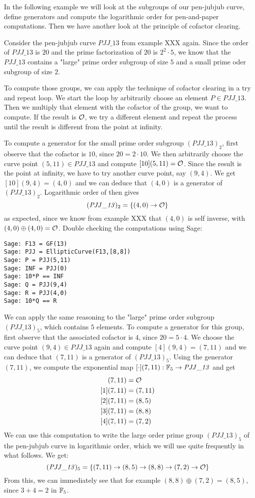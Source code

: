 In the following example we will look at the subgroups of our pen-jubjub curve, define generators and compute the logarithmic order for pen-and-paper computations. Then we have another look at the principle of cofactor clearing.
\begin{example} Consider the pen-jubjub curve $\mathit{PJJ\_13}$ from example XXX again. Since the order of $\mathit{PJJ\_13}$ is $20$ and the prime factorization of $20$ is $2^2\cdot 5$, we know that the $\mathit{PJJ\_13}$ contains a "large" prime order subgroup of size $5$ and a small prime oder subgroup of size $2$. 

To compute those groups, we can apply the technique of cofactor clearing in a try and repeat loop. We start the loop by arbitrarily choose an element $P\in \mathit{PJJ\_13}$. Then we multiply that element with the cofactor of the group, we want to compute. If the result is $\mathcal{O}$, we try a different element and repeat the process until the result is different from the point at infinity.  

To compute a generator for the small prime order subgroup $(\mathit{PJJ\_13})_2$, first observe that the cofactor is $10$, since $20=2\cdot 10$. We then arbitrarily choose the curve point $(5,11)\in \mathit{PJJ\_13}$ and compute $[10](5,11)=\mathcal{O}$. Since the result is the point at infinity, we have to try another curve point, say $(9,4)$. We get $[10](9,4)=(4,0)$ and we can deduce that $(4,0)$ is a generator of $(\mathit{PJJ\_13})_2$. Logarithmic order of then gives
$$
(\mathit{PJJ\_13})_2 = \{(4,0)\to \mathcal{O}\}
$$
as expected, since we know from example XXX that $(4,0)$ is self inverse, with $(4,0)\oplus (4,0)=\mathcal{O}$. Double checking the computations using Sage: 
\begin{verbatim}
Sage: F13 = GF(13)
Sage: PJJ = EllipticCurve(F13,[8,8])
Sage: P = PJJ(5,11)
Sage: INF = PJJ(0)
Sage: 10*P == INF
Sage: Q = PJJ(9,4)
Sage: R = PJJ(4,0)
Sage: 10*Q == R
\end{verbatim}
We can apply the same reasoning to the "large" prime order subgroup $(\mathit{PJJ\_13})_5$, which contains $5$ elements. To compute a generator for this group, first observe that the associated cofactor is $4$, since $20=5\cdot 4$. We choose the curve point $(9,4)\in \mathit{PJJ\_13}$ again and compute $[4](9,4)=(7,11)$ and we can deduce that $(7,11)$ is a generator of $(\mathit{PJJ\_13})_5$. Using the generator $(7,11)$, we compute the exponential map $[\cdot](7,11): \mathbb{F}_5 \to \mathit{PJJ\_13}$ and get
\begin{align*}
[0](7,11) &= \Oinf\\
[1](7,11) &= (7,11)\\
[2](7,11) &= (8,5)\\
[3](7,11) &= (8,8)\\
[4](7,11) &= (7,2)
\end{align*}
We can use this computation to write the large order prime group $(\mathit{PJJ\_13})_5$ of the pen-jubjub curve in logarithmic order, which we will use quite frequently in what follows. We get:
$$
(\mathit{PJJ\_13})_5 = \{(7,11)\to(8,5)\to(8,8)\to(7,2)\to \mathcal{O}\}
$$
From this, we can immediately see that for example $(8,8)\oplus (7,2)= (8,5)$, since 
$3+4=2$ in $\mathbb{F}_5$.
\end{example}
